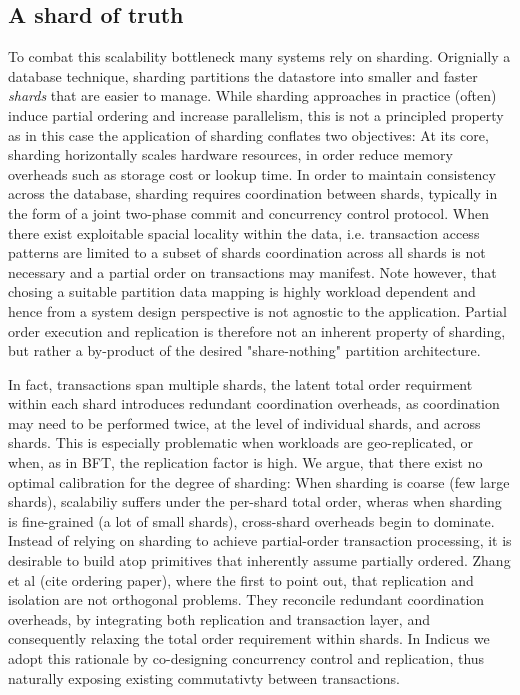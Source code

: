 \subsection{A shard of truth}
To combat this scalability bottleneck many systems rely on sharding. Orignially a database technique, sharding partitions the datastore into smaller and faster \textit{shards} that are easier to manage. While sharding approaches in practice (often) induce partial ordering and increase parallelism, this is not a principled property as in this case the application of sharding conflates two objectives:
At its core, sharding horizontally scales hardware resources, in order reduce memory overheads such as storage cost or lookup time. In order to maintain consistency across the database, sharding requires coordination between shards, typically in the form of a joint two-phase commit and concurrency control protocol. 
When there exist exploitable spacial locality within the data, i.e. transaction access patterns are limited to a subset of shards coordination across all shards is not necessary and a partial order on transactions may manifest. Note however, that chosing a suitable partition data mapping is highly workload dependent and hence from a system design perspective is not agnostic to the application.
Partial order execution and replication is therefore not an inherent property of sharding, but rather a by-product of the desired "share-nothing" partition architecture. 

In fact, transactions span multiple shards, the latent total order requirment within each shard introduces redundant coordination overheads, as coordination may need to be performed twice, at the level of individual shards, and across shards. This is especially problematic when workloads are geo-replicated, or when, as in BFT, the replication factor is high. 
We argue, that there exist no optimal calibration for the degree of sharding: When sharding is coarse (few large shards), scalabiliy suffers under the per-shard total order, wheras when sharding is fine-grained (a lot of small shards), cross-shard overheads begin to dominate. 
Instead of relying on sharding to achieve partial-order transaction processing, it is desirable to build atop primitives that inherently assume partially ordered.
Zhang et al (cite ordering paper), where the first to point out, that replication and isolation are not orthogonal problems. They reconcile redundant coordination overheads, by integrating both replication and transaction layer, and consequently relaxing the total order requirement within shards.
In Indicus we adopt this rationale by co-designing concurrency control and replication, thus naturally exposing existing commutativty between transactions.



